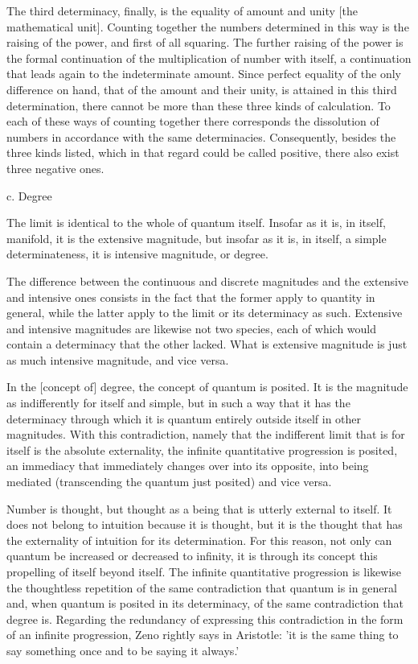     The third determinacy, finally, is
    the equality of amount and unity [the mathematical unit].
    Counting together the numbers determined in this way is
    the raising of the power, and first of all squaring.
    The further raising of the power is the formal
    continuation of the multiplication of number with itself,
    a continuation that leads again to the indeterminate amount.
    Since perfect equality of the only difference on hand,
    that of the amount and their unity, is attained in
    this third determination, there cannot be more than
    these three kinds of calculation.
    To each of these ways of counting together there corresponds
    the dissolution of numbers in accordance with the same determinacies.
    Consequently, besides the three kinds listed,
    which in that regard could be called positive,
    there also exist three negative ones.

c. Degree

The limit is identical to the whole of quantum itself.
Insofar as it is, in itself, manifold,
it is the extensive magnitude,
but insofar as it is, in itself,
a simple determinateness,
it is intensive magnitude,
or degree.

    The difference between the continuous and discrete magnitudes
    and the extensive and intensive ones consists in the fact
    that the former apply to quantity in general,
    while the latter apply to the limit or its determinacy as such.
    Extensive and intensive magnitudes are likewise not two species,
    each of which would contain a determinacy that the other lacked.
    What is extensive magnitude is just as much
    intensive magnitude, and vice versa.

In the [concept of] degree, the concept of quantum is posited.
It is the magnitude as indifferently for itself and simple,
but in such a way that it has the determinacy through which
it is quantum entirely outside itself in other magnitudes.
With this contradiction, namely that the indifferent limit
that is for itself is the absolute externality,
the infinite quantitative progression is posited,
an immediacy that immediately changes over into its opposite,
into being mediated (transcending the quantum just posited)
and vice versa.

    Number is thought, but thought as a being
    that is utterly external to itself.
    It does not belong to intuition because it is thought,
    but it is the thought that has the externality of intuition
    for its determination.
    For this reason, not only can quantum be
    increased or decreased to infinity,
    it is through its concept this
    propelling of itself beyond itself.
    The infinite quantitative progression is
    likewise the thoughtless repetition
    of the same contradiction
    that quantum is in general
    and, when quantum is posited in its determinacy,
    of the same contradiction that degree is.
    Regarding the redundancy of expressing
    this contradiction in the form
    of an infinite progression,
    Zeno rightly says in Aristotle:
    'it is the same thing to say something once
    and to be saying it always.'

